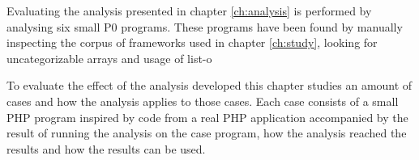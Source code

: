 Evaluating the analysis presented in chapter \ref{ch:analysis} is performed by analysing six small P0 programs. These programs have been found by manually inspecting the corpus of frameworks used in chapter \ref{ch:study}, looking for uncategorizable arrays and usage of list-o



To evaluate the effect of the analysis developed this chapter studies an amount of cases and how the analysis applies to those cases. Each case consists of a small PHP program inspired by code from a real PHP application accompanied by the result of running the analysis on the case program, how the analysis reached the results and how the results can be used.

